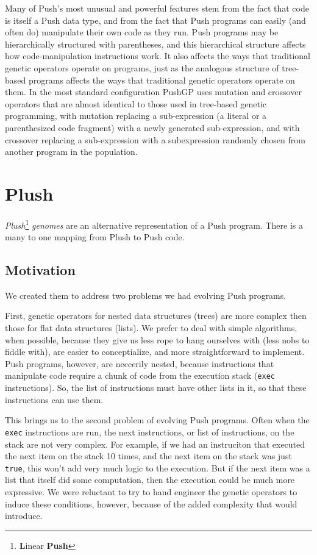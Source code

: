 Many of Push’s most unusual and powerful features stem from the fact that
code is itself a Push data type, and from the fact that Push programs can easily
(and often do) manipulate their own code as they run. Push programs may be hierarchically
structured with parentheses, and this hierarchical structure affects how
code-manipulation instructions work. It also affects the ways that traditional genetic
operators operate on programs, just as the analogous structure of tree-based
programs affects the ways that traditional genetic operators operate on them. In the
most standard configuration PushGP uses mutation and crossover operators that are
almost identical to those used in tree-based genetic programming, with mutation replacing
a sub-expression (a literal or a parenthesized code fragment) with a newly
generated sub-expression, and with crossover replacing a sub-expression with a subexpression
randomly chosen from another program in the population.


\section{Plush}
\textit{Plush}\footnote{\textbf{L}inear \textbf{Push}} \textit{genomes} are
an alternative representation of a Push program. There is a many to one mapping
from Plush to Push code.

\subsection{Motivation}
We created them to address two problems we had evolving Push programs.

First, genetic operators for nested data structures (trees) are more complex
then those for flat data structures (lists). We prefer to deal with simple
algorithms, when possible, because they give us less rope to hang ourselves with
(less nobs to fiddle with), are easier to conceptialize, and more straightforward
to implement. Push programs, however, are neccerily nested, because instructions
that manipulate code require a chunk of code from
the execution stack (\texttt{exec} instructions). So, the
list of instructions must have other lists in it, so that these instructions
can use them.

This brings us to the second problem of evolving Push programs. Often when the
\texttt{exec} instructions are run, the next instructions, or list of
instructions, on the stack are not very complex. For example, if we had an
instruciton that executed the next item on the stack 10 times, and the next
item on the stack was just \texttt{true}, this won't add very much logic to the
execution. But if the next item was a list that itself did some computation,
then the execution could be much more expressive. We were reluctant to try to
hand engineer the genetic operators to induce these conditions, however,
because of the added complexity that would introduce.

